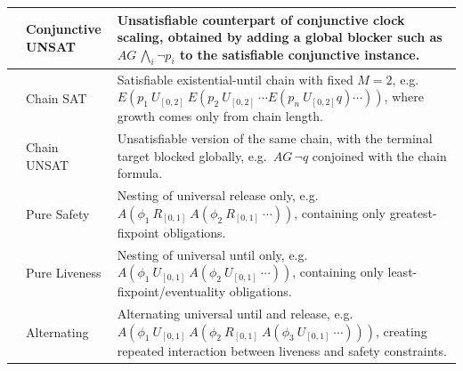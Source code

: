 \begin{longtable}{@{}ll|p{}@{}}
& Conjunctive UNSAT
& Unsatisfiable counterpart of conjunctive clock scaling, obtained by adding a global blocker such as
  $AG\,\bigwedge_i \neg p_i$
  to the satisfiable conjunctive instance. \\

\midrule

& Chain SAT
& Satisfiable existential-until chain with fixed $M=2$,
  e.g.\ $E(p_1\ U_{[0,2]}\ E(p_2\ U_{[0,2]}\ \cdots E(p_n\ U_{[0,2]} q)\cdots))$,
  where growth comes only from chain length. \\

& Chain UNSAT
& Unsatisfiable version of the same chain, with the terminal target blocked globally, e.g.\
  $AG\,\neg q$
  conjoined with the chain formula. \\

\midrule

& Pure Safety
& Nesting of universal release only, e.g.\
  $A(\phi_1\ R_{[0,1]}\ A(\phi_2\ R_{[0,1]}\ \cdots))$,
  containing only greatest-fixpoint obligations. \\

& Pure Liveness
& Nesting of universal until only, e.g.\
  $A(\phi_1\ U_{[0,1]}\ A(\phi_2\ U_{[0,1]}\ \cdots))$,
  containing only least-fixpoint/eventuality obligations. \\

& Alternating
& Alternating universal until and release,
  e.g.\ $A(\phi_1\ U_{[0,1]}\ A(\phi_2\ R_{[0,1]}\ A(\phi_3\ U_{[0,1]}\ \cdots)))$,
  creating repeated interaction between liveness and safety constraints. \\

\bottomrule
\end{longtable}



